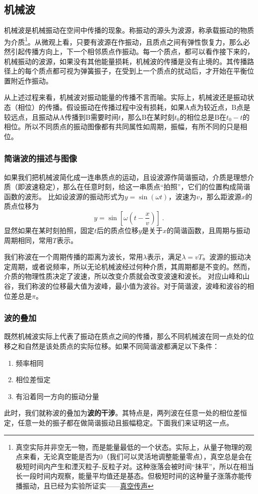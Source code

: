 
\subsection{机械波}
机械波是机械振动在空间中传播的现象。称振动的源头为波源，称承载振动的物质为介质\footnote{真空实际并非空无一物，而是能量最低的一个状态。实际上，从量子物理的观点来看，无论真空能是否为0（我们可以灵活地调整能量零点），真空总是会在极短时间内产生和湮灭粒子-反粒子对。这种涨落会被时间“抹平”，所以在相当长一段时间内观察，能量平均值还是基态。但极短时间的这种量子涨落亦能传播振动，且已经为实验所证实——\href{https://www.rmzxw.com.cn/c/2023-08-25/3399291.shtml}{真空传声}}。从微观上看，只要有波源在作振动，且质点之间有弹性恢复力，那么必然引起传播方向上，下一个相邻质点作振动。每一个质点，都可以看作接下来的，机械振动的波源，如果没有其他能量损耗，机械波的传播是没有止境的。其传播路径上的每个质点都可视为弹簧振子，在受到上一个质点的扰动后，才开始在平衡位置附近作振动。

从上述过程来看，机械波对振动能量的传播不言而喻。实际上，机械波还是振动状态（相位）的传播。假设振动在传播过程中没有损耗，如果A点为较近点，B点是较远点，且振动从A传播到B需要时间$t$，那么B在某时刻$t_0$的相位总是B在$t_0-t$的相位。所以不同质点的振动图像都有共同属性如周期，振幅，有所不同的只是相位。
\subsubsection{简谐波的描述与图像}
如果我们把机械波简化成一连串质点的运动，且设波源作简谐振动，介质是理想介质（即波速稳定），那么在任意时刻，给这一串质点“拍照”，它们的位置构成简谐函数的波形。
比如设波源的振动形式为$y=\sin(\omega t)$，波速为$v$，那么距波源$x$的质点位移为
\begin{equation}
y=\sin [\omega (t-\frac{x}{v})]~.
\end{equation}
显然如果在某时刻拍照，固定$t$后的质点位移$y$是关于$x$的简谐函数，且周期与振动周期相同，常用$T$表示。%

我们称波在一个周期传播的距离为波长，常用$\lambda $表示，满足$\lambda=vT$。波源的振动决定周期，或者说频率，所以无论机械波经过何种介质，其周期都是不变的。然而，介质的物理性质决定了波速，所以改变介质就会改变波速和波长。
对应山峰和山谷，我们称波的位移最大值为波峰，最小值为波谷。对于简谐波，波峰和波谷的相位差总是$\pi$。

\subsubsection{波的叠加}
既然机械波实际上代表了振动在质点之间的传播，那么不同机械波在同一点处的位移之和自然是该处质点的实际位移。如果不同简谐波都满足以下条件：
\begin{enumerate}
\item 频率相同
\item 相位差恒定
\item 有沿着同一方向的振动分量
\end{enumerate}
此时，我们就称波的叠加为\textbf{波的干涉}。其特点是，两列波在任意一处的相位差恒定，任意一处的振子都在做简谐振动且振幅稳定。下面我们来证明这一点。

